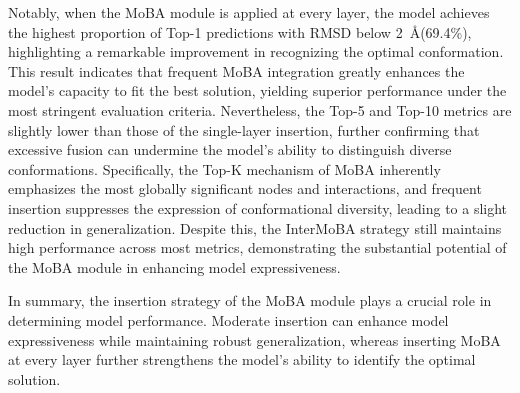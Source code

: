 \documentclass[11pt,a4paper]{article}
\begin{document}
Notably, when the MoBA module is applied at every layer, the model achieves the highest proportion of Top-1 predictions with RMSD below 2~\AA (69.4\%), highlighting a remarkable improvement in recognizing the optimal conformation. This result indicates that frequent MoBA integration greatly enhances the model's capacity to fit the best solution, yielding superior performance under the most stringent evaluation criteria. Nevertheless, the Top-5 and Top-10 metrics are slightly lower than those of the single-layer insertion, further confirming that excessive fusion can undermine the model's ability to distinguish diverse conformations. Specifically, the Top-K mechanism of MoBA inherently emphasizes the most globally significant nodes and interactions, and frequent insertion suppresses the expression of conformational diversity, leading to a slight reduction in generalization. Despite this, the InterMoBA strategy still maintains high performance across most metrics, demonstrating the substantial potential of the MoBA module in enhancing model expressiveness.

In summary, the insertion strategy of the MoBA module plays a crucial role in determining model performance. Moderate insertion can enhance model expressiveness while maintaining robust generalization, whereas inserting MoBA at every layer further strengthens the model's ability to identify the optimal solution.
\end{document}
